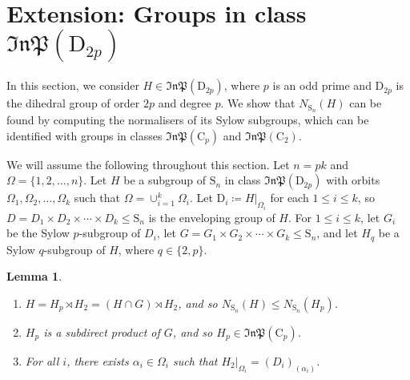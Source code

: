 \documentclass[11pt,a4paper]{article}
\newtheorem{lemma}[theorem]{Lemma}
\theoremstyle{definition}
\theoremstyle{remark}
\newcommand{\InP}{\mathfrak{InP}}
\newcommand{\Sy}{\mathrm{S}}
\newcommand{\Cy}{\mathrm{C}}
\newcommand{\Di}{\mathrm{D}}
\begin{document}

\section{Extension: Groups in class \texorpdfstring{$\InP(\Di_{2p})$}{InP(D2p)}}
\label{section: dihedral}\label{subdir of dihedral}

In this section, we consider $H \in \mathfrak{InP}(\Di_{2p})$, where $p$ is an odd prime and $\Di_{2p}$ is the dihedral group of order $2p$ and degree $p$. 
We show that $N_{\Sy_n}(H)$ can be found by computing the normalisers of its Sylow subgroups, which can be identified with groups in classes $\InP(\Cy_p)$ and $\InP(\Cy_2)$.

We will assume the following throughout this section. 
Let $n=pk$ and $\Omega= \{1,2, \ldots,  n \}$.
Let $H$ be a subgroup of $\Sy_n$ in class $\InP(\Di_{2p})$ with orbits $\Omega_1, \Omega_2, \ldots, \Omega_k$ such that $\Omega= \cup_{i=1}^k \Omega_i$. 
Let $\Di_i \coloneqq H|_{\Omega_i}$ for each $1 \leq i \leq k$, so $D = D_1 \times D_2 \times \cdots \times D_k \leq \Sy_n$ is the enveloping group of $H$. 
For $1 \leq i \leq {k}$, let $G_i$ be the Sylow $p$-subgroup of $D_i$, let $G = G_1 \times G_2 \times \cdots \times G_k \leq \Sy_n$, and let $H_q$ be a Sylow $q$-subgroup of $H$, where $q \in \{2,p\}$. 

\begin{lemma} \label{sylow p is intersection + norm inside norm of sylow p} \label{T2 results}
\begin{enumerate}
    \item \label{Tp normal in H} \label{H is TpT2} $H = H_p \rtimes H_2 = (H \cap G) \rtimes H_2$, and so $N_{\Sy_n}(H) \leq N_{\Sy_n}(H_p)$. 
    \item \label{Tp subdir of G}$H_p$ is a subdirect product of $G$, and so $H_p \in \InP(\Cy_p)$.
    \item \label{T2 is stab} \label{T2 is subdir of stab} For all $i$, there exists $\alpha_i \in \Omega_i$ such that $H_2|_{\Omega_i} = (D_i)_{(\alpha_i)}$.  %
\end{enumerate}
\end{lemma}
\end{document}

